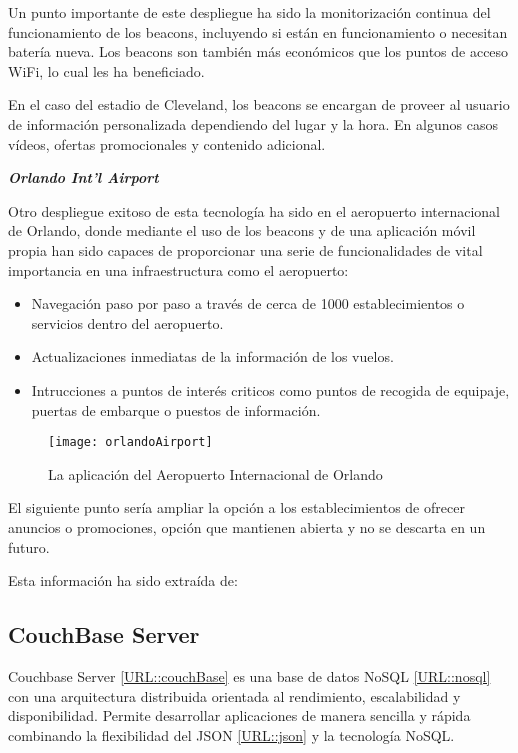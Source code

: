 Un punto importante de este  despliegue ha sido la monitorización continua del funcionamiento de los beacons, incluyendo si están en funcionamiento o necesitan batería nueva. Los beacons son también más económicos que los puntos de acceso WiFi, lo cual les ha beneficiado.

En el caso del estadio de Cleveland, los beacons se encargan de proveer al usuario de información personalizada dependiendo del lugar y la hora. En algunos casos vídeos, ofertas promocionales y contenido adicional.

\vspace{5mm}

\textsl{\textbf{{Orlando Int'l Airport}}}

\vspace{2mm}

Otro despliegue exitoso de esta tecnología ha sido en el aeropuerto internacional de Orlando, donde mediante el uso de los beacons y de una aplicación móvil propia han sido capaces de proporcionar una serie de funcionalidades de vital importancia en una infraestructura como el aeropuerto: 

\begin{itemize}
\item Navegación paso por paso a través de cerca de 1000 establecimientos o servicios dentro del aeropuerto. 
\item Actualizaciones inmediatas de la información de los vuelos. 
\item Intrucciones a puntos de interés criticos como puntos de recogida de equipaje, puertas de embarque o puestos de información.
\end{itemize}

\begin{figure}[H]
	\centering
	\texttt{[image: orlandoAirport]}
	\caption{La aplicación del Aeropuerto Internacional de Orlando}
	\label{fig:orlandoAirport}
\end{figure}

El siguiente punto sería ampliar la opción a los establecimientos de ofrecer anuncios o promociones, opción que mantienen abierta y no se descarta en un futuro.


Esta información ha sido extraída de: \cite{URL::Articulo} 

\subsection{CouchBase Server}

Couchbase Server \ref{URL::couchBase} es una base de datos NoSQL \ref{URL::nosql} con una arquitectura distribuida orientada al rendimiento, escalabilidad y disponibilidad. Permite desarrollar aplicaciones de manera sencilla y rápida combinando la flexibilidad del JSON \ref{URL::json} y la tecnología NoSQL.

